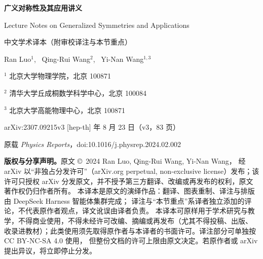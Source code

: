 
\begin{titlepage}
  \centering
  \vspace*{1.2cm}

  {\LARGE\bfseries 广义对称性及其应用讲义\par}
  \vspace{0.6cm}
  {\large Lecture Notes on Generalized Symmetries and Applications\par}
  \vspace{0.4cm}
  {\normalsize 中文学术译本（附审校译注与本节重点）\par}

  \vspace{1.6cm}
  {\large Ran Luo$^{1}$, \ Qing-Rui Wang$^{2}$, \ Yi-Nan Wang$^{1,3}$\par}

  \vspace{1.0cm}
  {\small
    $^1$ 北京大学物理学院，北京 100871\par
    \vspace{0.3cm}
    $^2$ 清华大学丘成桐数学科学中心，北京 100084\par
    \vspace{0.3cm}
    $^3$ 北京大学高能物理中心，北京 100871\par
  }

  \vspace{1.4cm}
  {\small arXiv:2307.09215v3 [hep-th]  年 8 月 23 日（v3，83 页）\par}
  \vspace{0.25cm}
  {\small 原载 \emph{Physics Reports}，doi:10.1016/j.physrep.2024.02.002\par}

  \vfill
  {\footnotesize
  \begin{minipage}{0.88\linewidth}
  \textbf{版权与分享声明。}原文 \copyright\ 2024 Ran Luo, Qing-Rui Wang, Yi-Nan Wang，
  经 arXiv 以“非独占分发许可”（arXiv.org perpetual, non-exclusive license）发布；该许可只授权
  arXiv 分发原文，并不授予第三方翻译、改编或再发布的权利，原文著作权仍归作者所有。
  本译本是原文的演绎作品：翻译、图表重制、译注与排版由 DeepSeek Harness 智能体集群完成；
  译注与“本节重点”系译者独立添加的评论，不代表原作者观点，译文讹误由译者负责。
  本译本可原样用于学术研究与教学，不得商业使用，不得未经许可改编、摘编或再发布（尤其不得投稿、出版、
  收录进教材）；此类使用须先取得原作者与本译者的书面许可。译注部分可单独按 CC BY-NC-SA 4.0 使用，
  但整份文档的许可上限由原文决定。若原作者或 arXiv 提出异议，将立即停止分发。
  \end{minipage}\par}
  \vspace{0.6cm}
\end{titlepage}

